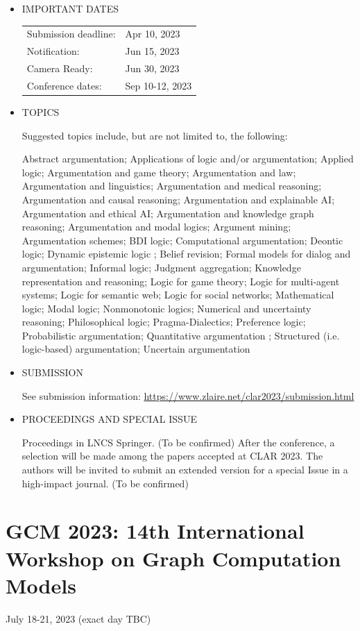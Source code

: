 \documentclass[prodmode,acmtecs]{acmsmall} %
\begin{document}
\begin{itemize}
\item  IMPORTANT DATES 
 
\begin{tabulary}{\linewidth}{LL}Submission deadline:  & Apr 10, 2023 \\
Notification:  & Jun 15, 2023 \\
Camera Ready:  & Jun 30, 2023 \\
Conference dates:  & Sep 10-12, 2023 \\
\end{tabulary}
 
\item  TOPICS 
 
  Suggested topics include, but are not limited to, the following: 
 
  Abstract argumentation; Applications of logic and/or argumentation; Applied logic; Argumentation and game theory; Argumentation and law; Argumentation and linguistics; Argumentation and medical reasoning; Argumentation and causal reasoning; Argumentation and explainable AI; Argumentation and ethical AI; Argumentation and knowledge graph reasoning; Argumentation and modal logics; Argument mining; Argumentation schemes; BDI logic; Computational argumentation; Deontic logic; Dynamic epistemic logic ; Belief revision; Formal models for dialog and argumentation; Informal logic; Judgment aggregation; Knowledge representation and reasoning; Logic for game theory; Logic for multi-agent systems; Logic for semantic web; Logic for social networks; Mathematical logic; Modal logic; Nonmonotonic logics; Numerical and uncertainty reasoning; Philosophical logic; Pragma-Dialectics; Preference logic; Probabilistic argumentation; Quantitative argumentation  ; Structured (i.e. logic-based) argumentation; Uncertain argumentation  
 
\item  SUBMISSION 
 
  See submission information: \href{https://www.zlaire.net/clar2023/submission.html}{https://www.zlaire.net/clar2023/submission.html} 
 
\item  PROCEEDINGS AND SPECIAL ISSUE 
 
  Proceedings in LNCS Springer. (To be confirmed) After the conference, a selection will be made among the papers accepted at CLAR 2023. The authors will be invited to submit an extended version for a special Issue in a high-impact journal. (To be confirmed) 
 
\end{itemize}\section{GCM 2023: 14th International Workshop on Graph Computation Models}\label{GCM2023}  July 18-21, 2023 (exact day TBC)\\ 
\end{document}
